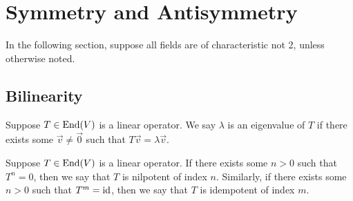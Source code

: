 \section{Symmetry and Antisymmetry}

\begin{remark}
    In the following section,
    suppose all fields are of characteristic not 2,
    unless otherwise noted.
\end{remark}

\subsection*{Bilinearity}

\begin{definition}
    Suppose \(T \in \operatorname{End}(V)\) is a linear operator.
    We say \(\lambda\) is an eigenvalue of \(T\)
    if there exists some \(\vec{v} \neq \vec{0}\) such that \(T\vec{v} = \lambda\vec{v}\).
\end{definition}
\begin{definition}
    Suppose \(T \in \operatorname{End}(V)\) is a linear operator.
    If there exists some \(n > 0\) such that \(T^n = 0\),
    then we say that \(T\) is nilpotent of index \(n\).
    Similarly, if there exists some \(n > 0\) such that \(T^m = \operatorname{id}\),
    then we say that \(T\) is idempotent of index \(m\).
\end{definition}

